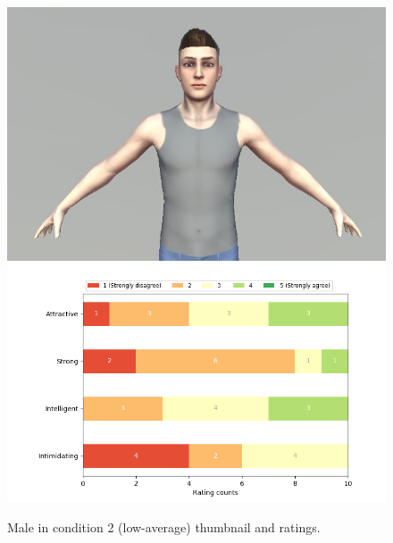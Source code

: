 \begin{figure}[H]
  \includegraphics[width=\linewidth]{Images/Males/12.JPG}
\endminipage\hfill
{}
  \includegraphics[width=\linewidth]{Survey/avatar_m_experiment2.png}
\endminipage\hfill
\caption{Male in condition 2 (low-average) thumbnail and ratings.}
\end{figure}

